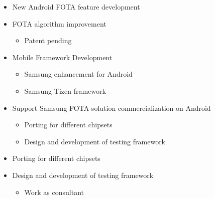 \documentclass[11pt,a4paper,sans]{moderncv}        %
\begin{document}
%
\begin{itemize}%
\item New Android FOTA feature development
\item FOTA algorithm improvement
  \begin{itemize}%
  \item Patent pending
  \end{itemize}
\item Mobile Framework Development
  \begin{itemize}%
  \item Samsung enhancement for Android
  \item Samsung Tizen framework
  \end{itemize}
\item Support Samsung FOTA solution commercialization on Android
  \begin{itemize}%
  \item Porting for different chipsets
  \item Design and development of testing framework\\
  \end{itemize}
\end{itemize}
%
\begin{itemize}%
  \item Porting for different chipsets
  \item Design and development of testing framework\\
  \begin{itemize}%
  \item Work as consultant
  \end{itemize}
\end{itemize}
\end{document}
